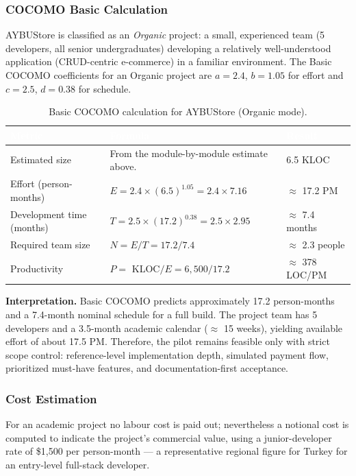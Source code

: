 \documentclass[11pt,a4paper]{article}
\begin{document}
\subsubsection*{COCOMO Basic Calculation}
AYBUStore is classified as an \emph{Organic} project: a small,
experienced team (5 developers, all senior undergraduates) developing
a relatively well-understood application (CRUD-centric e-commerce) in
a familiar environment. The Basic COCOMO coefficients for an Organic
project are $a = 2.4$, $b = 1.05$ for effort and $c = 2.5$, $d = 0.38$
for schedule.

\begin{table}[H]
\centering
\small
\begin{tabular}{|p{}|p{}|p{}|}
\hline
\rowcolor{aybuHeader}
\textcolor{white}{\textbf{Metric}} &
\textcolor{white}{\textbf{Formula}} &
\textcolor{white}{\textbf{Result}} \\ \hline

Estimated size & From the module-by-module estimate above. & 6.5 KLOC \\ \hline
Effort (person-months) & $E = 2.4 \times (6.5)^{1.05} = 2.4 \times 7.16$ & $\approx$ 17.2 PM \\ \hline
Development time (months) & $T = 2.5 \times (17.2)^{0.38} = 2.5 \times 2.95$ & $\approx$ 7.4 months \\ \hline
Required team size & $N = E / T = 17.2 / 7.4$ & $\approx$ 2.3 people \\ \hline
Productivity & $P = $ KLOC$ / E = 6{,}500 / 17.2$ & $\approx$ 378 LOC/PM \\ \hline
\end{tabular}
\caption{Basic COCOMO calculation for AYBUStore (Organic mode).}
\label{tab:cocomo}
\end{table}

\noindent
\textbf{Interpretation.} Basic COCOMO predicts approximately
17.2 person-months and a 7.4-month nominal schedule for a full build.
The project team has 5 developers and a 3.5-month academic calendar
($\approx$ 15 weeks), yielding available effort of about 17.5 PM.
Therefore, the pilot remains feasible only with strict scope control:
reference-level implementation depth, simulated payment flow,
prioritized must-have features, and documentation-first acceptance.

\subsubsection*{Cost Estimation}
For an academic project no labour cost is paid out; nevertheless a
notional cost is computed to indicate the project's commercial value,
using a junior-developer rate of \$1{,}500 per person-month --- a
representative regional figure for Turkey for an entry-level
full-stack developer.
\end{document}
